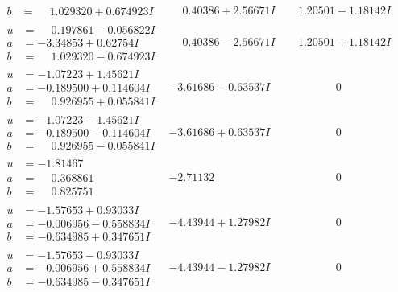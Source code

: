 \documentclass[1p]{elsarticle_modified}
\theoremstyle{definition}
\begin{document}
$$\begin{array}{c|c|c}
\begin{aligned}
b &= \phantom{-}1.029320 + 0.674923 I\end{aligned}
 & \phantom{-}0.40386 + 2.56671 I & \phantom{-}1.20501 - 1.18142 I \\ \hline\begin{aligned}
u &= \phantom{-}0.197861 - 0.056822 I \\
a &= -3.34853 + 0.62754 I \\
b &= \phantom{-}1.029320 - 0.674923 I\end{aligned}
 & \phantom{-}0.40386 - 2.56671 I & \phantom{-}1.20501 + 1.18142 I \\ \hline\begin{aligned}
u &= -1.07223 + 1.45621 I \\
a &= -0.189500 + 0.114604 I \\
b &= \phantom{-}0.926955 + 0.055841 I\end{aligned}
 & -3.61686 - 0.63537 I & \phantom{-0.000000 } 0 \\ \hline\begin{aligned}
u &= -1.07223 - 1.45621 I \\
a &= -0.189500 - 0.114604 I \\
b &= \phantom{-}0.926955 - 0.055841 I\end{aligned}
 & -3.61686 + 0.63537 I & \phantom{-0.000000 } 0 \\ \hline\begin{aligned}
u &= -1.81467\phantom{ +0.000000I} \\
a &= \phantom{-}0.368861\phantom{ +0.000000I} \\
b &= \phantom{-}0.825751\phantom{ +0.000000I}\end{aligned}
 & -2.71132\phantom{ +0.000000I} & \phantom{-0.000000 } 0 \\ \hline\begin{aligned}
u &= -1.57653 + 0.93033 I \\
a &= -0.006956 - 0.558834 I \\
b &= -0.634985 + 0.347651 I\end{aligned}
 & -4.43944 + 1.27982 I & \phantom{-0.000000 } 0 \\ \hline\begin{aligned}
u &= -1.57653 - 0.93033 I \\
a &= -0.006956 + 0.558834 I \\
b &= -0.634985 - 0.347651 I\end{aligned}
 & -4.43944 - 1.27982 I & \phantom{-0.000000 } 0 \\ \hline\begin{aligned}

\end{aligned}
\end{array}$$
\end{document}
